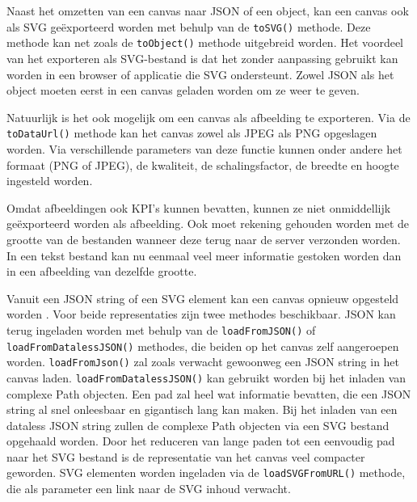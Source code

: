 Naast het omzetten van een canvas naar JSON of een object, kan een canvas ook als SVG ge\"{e}xporteerd worden met behulp van de \texttt{toSVG()} methode. Deze methode kan net zoals de \texttt{toObject()} methode uitgebreid worden. Het voordeel van het exporteren als SVG-bestand is dat het zonder aanpassing gebruikt kan worden in een browser of applicatie die SVG ondersteunt. Zowel JSON als het object moeten eerst in een canvas geladen worden om ze weer te geven. 

Natuurlijk is het ook mogelijk om een canvas als afbeelding te exporteren. Via de \texttt{toDataUrl()} methode kan het canvas zowel als JPEG als PNG opgeslagen worden. Via verschillende parameters van deze functie kunnen onder andere het formaat (PNG of JPEG), de kwaliteit, de schalingsfactor, de breedte en hoogte ingesteld worden.

Omdat afbeeldingen ook KPI's kunnen bevatten, kunnen ze niet onmiddellijk ge\"{e}xporteerd worden als afbeelding. Ook moet rekening gehouden worden met de grootte van de bestanden wanneer deze terug naar de server verzonden worden. In een tekst bestand kan nu eenmaal veel meer informatie gestoken worden dan in een afbeelding van dezelfde grootte. 

Vanuit een JSON string of een SVG element kan een canvas opnieuw opgesteld worden \cite{SVGElement}. Voor beide representaties zijn twee methodes beschikbaar. JSON kan terug ingeladen worden met behulp van de \texttt{loadFromJSON()} of \texttt{loadFromDatalessJSON()} methodes, die beiden op het canvas zelf aangeroepen worden. \texttt{loadFromJson()} zal zoals verwacht gewoonweg een JSON string in het canvas laden. \texttt{loadFromDatalessJSON()} kan gebruikt worden bij het inladen van complexe Path objecten. Een pad zal heel wat informatie bevatten, die een JSON string al snel onleesbaar en gigantisch lang kan maken. Bij het inladen van een dataless JSON string zullen de complexe Path objecten via een SVG bestand opgehaald worden. Door het reduceren van lange paden tot een eenvoudig pad naar het SVG bestand is de representatie van het canvas veel compacter geworden. SVG elementen worden ingeladen via de \texttt{loadSVGFromURL()} methode, die als parameter een link naar de SVG inhoud verwacht. 

